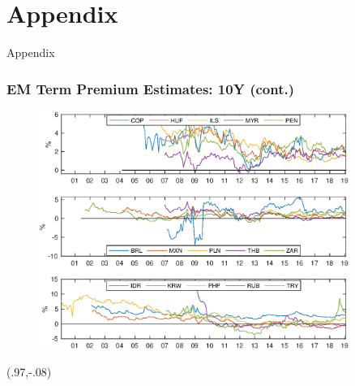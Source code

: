 \documentclass[12pt, aspectratio=169, xcolor=dvipsnames]{beamer}  %
\begin{document}
\section{Appendix}

\begin{frame}
	\begin{center}
		\huge \textcolor{yaleblue}{Appendix}
	\end{center}
\end{frame}

\begin{frame}[label=tp_10yrB]
	\frametitle{EM Term Premium Estimates: 10Y (cont.)}
	\begin{figure}[!htbp]
		\begin{center} %
			\includegraphics[trim={0 0 0 4cm},clip, width=0.9\textwidth,height=0.65\textheight]{../Figures/Temp/temp_tp10yrEM}
			\par\end{center}
	\end{figure}
	\begin{textblock*}{3cm}(.97\textwidth,-.08\textheight)
		\hyperlink{tp_10yrA}{}
	\end{textblock*}
\end{frame}
\end{document}
